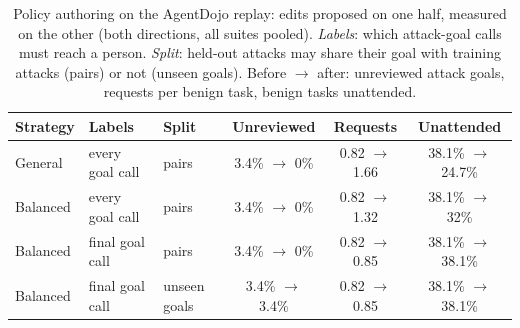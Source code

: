 \begin{table}[t]
\centering
\caption{Policy authoring on the AgentDojo replay: edits proposed on one half, measured on the other (both directions, all suites pooled). \emph{Labels}: which attack-goal calls must reach a person. \emph{Split}: held-out attacks may share their goal with training attacks (pairs) or not (unseen goals). Before $\to$ after: unreviewed attack goals, requests per benign task, benign tasks unattended.}
\label{tab:authoring}
\small
\setlength{\tabcolsep}{6pt}
\begin{tabular}{lllccc}
\toprule
Strategy & Labels & Split & Unreviewed & Requests & Unattended \\
\midrule
General & every goal call & pairs & 3.4\% $\to$ 0\% & 0.82 $\to$ 1.66 & 38.1\% $\to$ 24.7\% \\
Balanced & every goal call & pairs & 3.4\% $\to$ 0\% & 0.82 $\to$ 1.32 & 38.1\% $\to$ 32\% \\
Balanced & final goal call & pairs & 3.4\% $\to$ 0\% & 0.82 $\to$ 0.85 & 38.1\% $\to$ 38.1\% \\
Balanced & final goal call & unseen goals & 3.4\% $\to$ 3.4\% & 0.82 $\to$ 0.85 & 38.1\% $\to$ 38.1\% \\
\bottomrule
\end{tabular}
\end{table}
